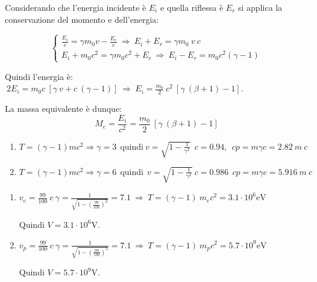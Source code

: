 \documentclass[12pt,twoside,a4]{article}
\begin{document}
\begin{solution}
	  Considerando che l'energia incidente è $E_i$ e quella riflessa è $E_r$ si applica la conservazione del momento e dell'energia: 

  \begin{equation*}
       \begin{cases}
       \frac{E_i}{c} = \gamma m_0 v - \frac{E_r}{c}  \  \Rightarrow  \  E_i + E_r = \gamma m_0 \ v \ c \\
       E_i + m_0 c^2 = \gamma m_0 c^2 + E_r  \  \Rightarrow  \  E_i - E_r = m_0 c^2 (\gamma - 1) 
       \end{cases}
  \end{equation*}

  
  Quindi l'energia è:   $  \  2 E_i = m_0 c \ [\gamma \ v + c \ (\gamma -1)]  \  \Rightarrow  \  E_i = \frac{m_0}{2} \ c^2 \ [\gamma \ (\beta + 1) - 1] $. 
  
  \medskip
  La massa equivalente è dunque: \begin{equation*}
      M_e = \frac{E_i}{c^2} = \frac{m_0}{2} \ [\gamma \ ( \beta + 1) -1] 
  \end{equation*}
\end{solution}


\begin{solution}
\vspace{-1cm}
\begin{enumerate}[label=(\textit{\roman*})]
	  \item $
     T = (\gamma -1) m c^2  \Rightarrow  \gamma = 3  \ \  \text{quindi}  \ v = \sqrt{1 - \frac{1}{\gamma^2}} \ \  c = 0.94, \ \ c   p = m \gamma c = 2.82 \ m \ c $

 \item $T = (\gamma -1) m c^2  \Rightarrow  \gamma = 6  \ \ \text{quindi} \ \ v = \sqrt{1 - \frac{1}{\gamma^2}} \ c = 0.986 \  \ c  p = m \gamma c = 5.916 \ m \ c$
 \end{enumerate}
\end{solution}

\newpage
\begin{solution}
\vspace{-1cm}
\begin{enumerate}[label=(\textit{\roman*})]
	 \item $
     v_e =\frac{99}{100} \ c  \  \gamma = \frac{1}{\sqrt{1 - \left(\frac{99}{100}\right)^2}} = 7.1  \  \Rightarrow  \  T = (\gamma -1) \ m_e c^2 = 3.1 \cdot 10^6 \mathrm{eV}$
  
 Quindi $V = 3.1 \cdot 10^6 \mathrm{V}$.
 
\item $v_p =\frac{99}{100} \ c  \  \gamma = \frac{1}{\sqrt{1 - \left(\frac{99}{100}\right)^2}} = 7.1  \  \Rightarrow  \  T = (\gamma -1) \ m_p c^2 = 5.7 \cdot 10^9 \mathrm{eV} $

Quindi $V = 5.7 \cdot 10^9 \mathrm{V}$.
 \end{enumerate}


\end{solution}
\end{document}
